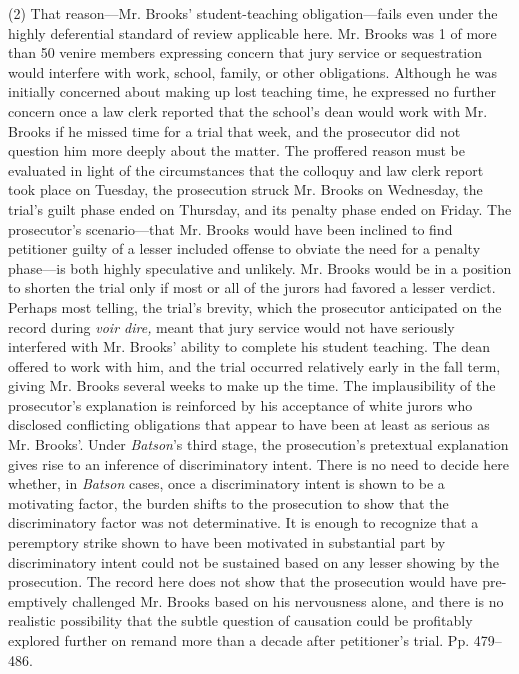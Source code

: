 (2) That reason---Mr. Brooks' student-teaching obligation---fails
even under the highly deferential standard of review applicable here.
Mr. Brooks was 1 of more than 50 venire members expressing concern
that jury service or sequestration would interfere with work, school,
family, or other obligations. Although he was initially concerned about
making up lost teaching time, he expressed no further concern once a
law clerk reported that the school's dean would work with Mr. Brooks
if he missed time for a trial that week, and the prosecutor did not
question him more deeply about the matter. The proffered reason must
be evaluated in light of the circumstances that the colloquy and law
clerk report took place on Tuesday, the prosecution struck Mr. Brooks
on Wednesday, the trial's guilt phase ended on Thursday, and its
penalty phase ended on Friday. The prosecutor's scenario---that Mr.
Brooks would have been inclined to find petitioner guilty of a lesser
included offense to obviate the need for a penalty phase---is both
highly speculative and unlikely. Mr. Brooks would be in a position
to shorten the trial only if most or all of the jurors had favored a
lesser verdict. Perhaps most telling, the trial's brevity, which the
prosecutor anticipated on the record during \emph{voir dire,} meant that
jury service would not have seriously interfered with Mr. Brooks'
ability to complete his student teaching. The dean offered to work with
him, and the trial occurred relatively early in the fall term, giving
Mr. Brooks several weeks to make up the time. The implausibility of the
prosecutor's explanation is reinforced by his acceptance of white
jurors who disclosed conflicting obligations that appear to have been
at least as serious as Mr. Brooks'. Under \emph{Batson}'s third stage,
the prosecution's pretextual explanation gives rise to an inference
of discriminatory intent. There is no need to decide here whether,
in \emph{Batson} cases, once a discriminatory intent is shown to be a
motivating factor, the burden shifts to the prosecution to show that the
discriminatory factor was not determinative. It is enough to recognize
that a peremptory strike shown to have been motivated in substantial
part by discriminatory intent could not be sustained based on any lesser
showing by the prosecution. The record here does not show that the
prosecution would have pre-emptively challenged Mr. Brooks based on his
nervousness alone, and there is no realistic possibility that the subtle
question of causation could be profitably explored further on remand
more than a decade after petitioner's trial. Pp. 479--486.

